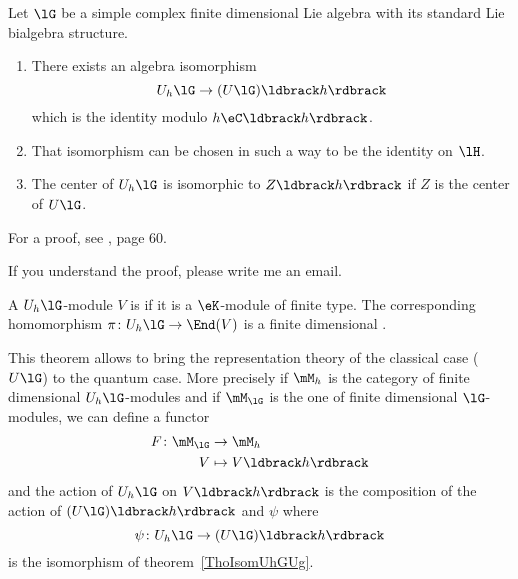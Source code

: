 \begin{theorem}     \label{ThoIsomUhGUg}
	Let \( \lG\) be a simple complex finite dimensional Lie algebra with its standard Lie bialgebra structure.
	\begin{enumerate}
		\item

		      There exists an algebra isomorphism
		      \begin{equation}
			      U_h\lG\to(U\lG)\ldbrack h\rdbrack
		      \end{equation}
		      which is the identity modulo \( h\eC\ldbrack h\rdbrack\).
		\item
		      That isomorphism can be chosen in such a way to be the identity on \( \lH\).
		\item
		      The center of \( U_h\lG\) is isomorphic to \( Z\ldbrack h\rdbrack\) if \( Z\) is the center of \( U\lG\).
	\end{enumerate}

\end{theorem}

For a proof, see \cite{SoibelmanI}, page 60.

\begin{probleme}
	If you understand the proof, please write me an email.
\end{probleme}

A \( U_h\lG\)-module \( V\) is  if it is  a \( \eK\)-module of finite type. The corresponding homomorphism \( \pi\colon U_h\lG\to \End(V)\) is a finite dimensional .

This theorem allows to bring the representation theory of the classical case (\( U\lG\)) to the quantum case. More precisely if \( \mM_h\) is the category of finite dimensional \( U_h\lG\)-modules and if \( \mM_{\lG}\) is the one of finite dimensional \( \lG\)-modules, we can define a functor
\begin{equation}
	\begin{aligned}
		F\colon \mM_{\lG} & \to \mM_h                   \\
		V                 & \mapsto V\ldbrack h\rdbrack
	\end{aligned}
\end{equation}
and the action of \( U_h\lG\) on \( V\ldbrack h\rdbrack\) is the composition of the action of \( (U\lG)\ldbrack h\rdbrack \) and \( \psi\) where
\begin{equation}
	\psi\colon U_h\lG\to (U\lG)\ldbrack h\rdbrack
\end{equation}
is the isomorphism of theorem~\ref{ThoIsomUhGUg}.

